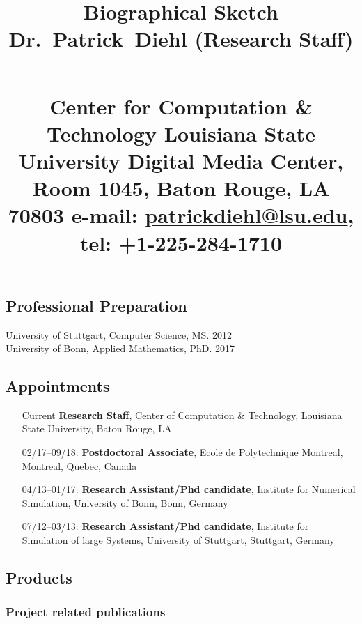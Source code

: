 \documentclass[svgnames,11pt]{article}
\title{%
        \vspace{-2\baselineskip}
            \normalsize
            Biographical Sketch\\
            {\large\textbf{Dr.~Patrick~Diehl (Research Staff)}}\\
            \vspace{0.5\baselineskip}
            \hrule
            \vspace{0.5\baselineskip}
            Center for Computation \& Technology
Louisiana State University
Digital Media Center, Room 1045, Baton Rouge, LA  70803
            e-mail: \href{mailto:patrickdiehl@lsu.edu}{patrickdiehl@lsu.edu},
            tel: +1-225-284-1710
        \vspace{-1.5ex}
        }
\date{}
\author{}
\begin{document}
\maketitle
\vspace{-4\baselineskip}

\subsection{Professional Preparation}

    University of Stuttgart,  Computer Science, MS. 2012
        \\
    University of Bonn, Applied Mathematics,  PhD. 2017

\subsection{Appointments}

\begin{itemize}[label={--9999:},leftmargin=*,itemsep=0pt]

    \item[Current]
        \textbf{Research Staff},
        Center of Computation \& Technology, Louisiana State University,
        Baton Rouge, LA
    \item[02/17--09/18:]
        \textbf{Postdoctoral Associate},
        Ecole de Polytechnique Montreal,
        Montreal, Quebec, Canada
    \item[04/13--01/17:]
        \textbf{Research Assistant/Phd candidate},
        Institute for Numerical Simulation, University of Bonn, Bonn, Germany
    \item[07/12--03/13:]
        \textbf{Research Assistant/Phd candidate},
        Institute for Simulation of large Systems, University of Stuttgart, Stuttgart, Germany
\end{itemize}

\subsection{Products}

\subsubsection{Project related publications}
\end{document}
